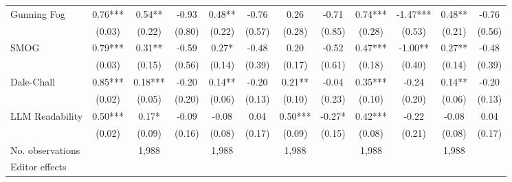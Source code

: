 \begin{table}
\begin{threeparttable}
\begin{tabular}{p{3cm}S@{}S@{}S@{}S@{}S@{}S@{}S@{}S@{}S@{}S@{}S@{}}
            Gunning Fog                   &        0.76***&        0.54** &       -0.93   &        0.48** &       -0.76   &        0.26   &       -0.71   &        0.74***&       -1.47***&        0.48** &       -0.76   \\
                                          &      (0.03)   &      (0.22)   &      (0.80)   &      (0.22)   &      (0.57)   &      (0.28)   &      (0.85)   &      (0.28)   &      (0.53)   &      (0.21)   &      (0.56)   \\
            SMOG                          &        0.79***&        0.31** &       -0.59   &        0.27*  &       -0.48   &        0.20   &       -0.52   &        0.47***&       -1.00** &        0.27** &       -0.48   \\
                                          &      (0.03)   &      (0.15)   &      (0.56)   &      (0.14)   &      (0.39)   &      (0.17)   &      (0.61)   &      (0.18)   &      (0.40)   &      (0.14)   &      (0.39)   \\
            Dale-Chall                    &        0.85***&        0.18***&       -0.20   &        0.14** &       -0.20   &        0.21** &       -0.04   &        0.35***&       -0.24   &        0.14** &       -0.20   \\
                                          &      (0.02)   &      (0.05)   &      (0.20)   &      (0.06)   &      (0.13)   &      (0.10)   &      (0.23)   &      (0.10)   &      (0.20)   &      (0.06)   &      (0.13)   \\
            LLM Readability        &        0.50***&        0.17*  &       -0.09   &       -0.08   &        0.04   &        0.50***&       -0.27*  &        0.42***&       -0.22   &       -0.08   &        0.04   \\
                                          &      (0.02)   &      (0.09)   &      (0.16)   &      (0.08)   &      (0.17)   &      (0.09)   &      (0.15)   &      (0.08)   &      (0.21)   &      (0.08)   &      (0.17)   \\
            \midrule
            No. observations              &               &       1,988   &               &       1,988   &               &       1,988   &               &       1,988   &               &       1,988   &               \\
            \midrule
            Editor effects        &               &           {}   &               &           {}   &               &           {}   &               &           {}   &               &               &               \\

\end{tabular}
\end{threeparttable}
\end{table}
